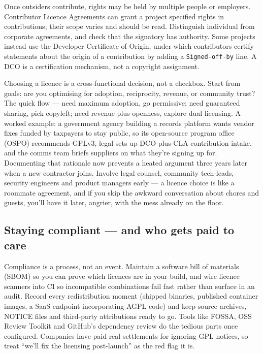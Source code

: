 Once outsiders contribute, rights may be held by multiple people or employers. Contributor Licence Agreements can grant a project specified rights in contributions; their scope varies and should be read. Distinguish individual from corporate agreements, and check that the signatory has authority. Some projects instead use the Developer Certificate of Origin, under which contributors certify statements about the origin of a contribution by adding a \texttt{Signed-off-by} line. A DCO is a certification mechanism, not a copyright assignment. \autocite{dco}


Choosing a licence is a cross-functional decision, not a checkbox. Start from goals: are you optimising for adoption, reciprocity, revenue, or community trust? The quick flow — need maximum adoption, go permissive; need guaranteed sharing, pick copyleft; need revenue plus openness, explore dual licensing. A worked example: a government agency building a records platform wants vendor fixes funded by taxpayers to stay public, so its open-source program office (OSPO) recommends GPLv3, legal sets up DCO-plus-CLA contribution intake, and the comms team briefs suppliers on what they're signing up for. Documenting that rationale now prevents a heated argument three years later when a new contractor joins. Involve legal counsel, community tech-leads, security engineers and product managers early — a licence choice is like a roommate agreement, and if you skip the awkward conversation about chores and guests, you'll have it later, angrier, with the mess already on the floor.



\subsection{Staying compliant — and who gets paid to care}


Compliance is a process, not an event. Maintain a software bill of materials (SBOM) so you can prove which licences are in your build, and wire licence scanners into CI so incompatible combinations fail fast rather than surface in an audit. Record every redistribution moment (shipped binaries, published container images, a SaaS endpoint incorporating AGPL code) and keep source archives, NOTICE files and third-party attributions ready to go. Tools like FOSSA, OSS Review Toolkit and GitHub's dependency review do the tedious parts once configured. Companies have paid real settlements for ignoring GPL notices, so treat ``we'll fix the licensing post-launch'' as the red flag it is.



